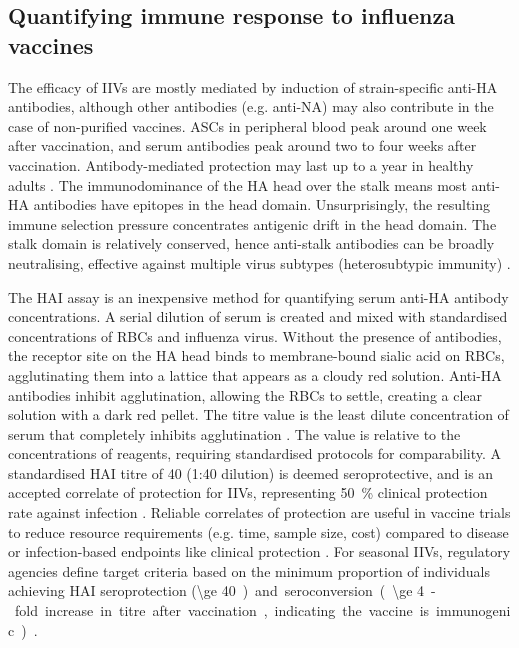\subsection{Quantifying immune response to influenza vaccines}

The efficacy of \glspl{IIV} are mostly mediated by induction of strain-specific anti-\gls{HA} antibodies,
although other antibodies (e.g. anti-\gls{NA}) may also contribute in the case of non-purified vaccines.
\Glspl{ASC} in peripheral blood peak around one week after vaccination, and serum antibodies peak around two to four weeks after vaccination.
Antibody-mediated protection may last up to a year in healthy adults \autocite{bresee2018InactivatedInfluenzaVaccines,davis2020InfluenzaVaccineInduced}.
The immunodominance of the \gls{HA} head over the stalk means most anti-\gls{HA} antibodies have epitopes in the head domain.
Unsurprisingly, the resulting immune selection pressure concentrates antigenic drift in the head domain.
The stalk domain is relatively conserved, hence anti-stalk antibodies can be broadly neutralising, effective against multiple virus subtypes (heterosubtypic immunity) \autocite{sano2017RoadMoreEffective}.

The \gls{HAI} assay is an inexpensive method for quantifying serum anti-\gls{HA} antibody concentrations. 
A serial dilution of serum is created and mixed with standardised concentrations of \glspl{RBC} and influenza virus. 
Without the presence of antibodies, the receptor site on the \gls{HA} head binds to membrane-bound sialic acid on \glspl{RBC}, agglutinating them into a lattice that appears as a cloudy red solution.
Anti-\gls{HA} antibodies inhibit agglutination, allowing the \glspl{RBC} to settle, creating a clear solution with a dark red pellet. 
The titre value is the least dilute concentration of serum that completely inhibits agglutination \autocite{klimov2012InfluenzaVirusTitration}.
The value is relative to the concentrations of reagents, requiring standardised protocols for comparability.
A standardised \gls{HAI} titre of 40 (1:40 dilution) is deemed seroprotective, and is an accepted correlate of protection for \glspl{IIV},
representing \SI{50}{\percent} clinical protection rate against infection \autocite{cox2013CorrelatesProtectionInfluenza,bresee2018InactivatedInfluenzaVaccines}.
Reliable correlates of protection are useful in vaccine trials to reduce resource requirements (e.g. time, sample size, cost) compared to disease or infection-based endpoints like clinical protection \autocite{pulendran2010SystemsVaccinology}.
For seasonal \glspl{IIV}, regulatory agencies define target criteria based on the
minimum proportion of individuals achieving \gls{HAI} seroprotection (\SI{\ge 40}) 
and seroconversion (\SI{\ge 4}-fold increase in titre after vaccination, indicating the vaccine is immunogenic) \autocite{cox2013CorrelatesProtectionInfluenza,sano2017RoadMoreEffective,krammer2019HumanAntibodyResponse}.

